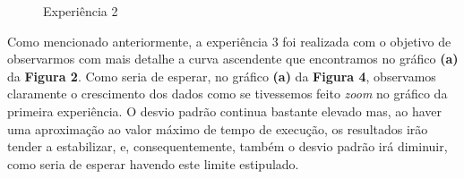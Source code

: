 \documentclass{article}
\begin{document}
\begin{figure} [!htbp]
    \centering
    \qquad
    \caption{Experiência 2}%
    \label{fig:example}%
\end{figure}

Como mencionado anteriormente, a experiência 3 foi realizada com o objetivo de observarmos com mais detalhe a curva ascendente que encontramos no gráfico \textbf{(a)} da \textbf{Figura 2}. Como seria de esperar, no gráfico \textbf{(a)} da \textbf{Figura 4}, observamos claramente o crescimento dos dados como se tivessemos feito \textit{zoom} no gráfico da primeira experiência. O desvio padrão continua bastante elevado mas, ao haver uma aproximação ao valor máximo de tempo de execução, os resultados irão tender a estabilizar, e, consequentemente, também o desvio padrão irá diminuir, como seria de esperar havendo este limite estipulado.\par
\end{document}
